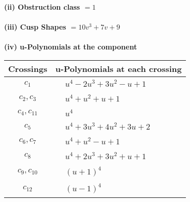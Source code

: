 \documentclass[1p]{elsarticle_modified}
\theoremstyle{definition}
\begin{document}
\flushleft \textbf{(ii) Obstruction class $= 1$}\\~\\
\flushleft \textbf{(iii) Cusp Shapes $= 10 v^3+7 v+9$}\\~\\
\newpage\renewcommand{\arraystretch}{1}
\flushleft \textbf{(iv) u-Polynomials at the component}\newline \\
\begin{tabular}{m{50pt}|m{274pt}}
Crossings & \hspace{64pt}u-Polynomials at each crossing \\
\hline $$\begin{aligned}c_{1}\end{aligned}$$&$\begin{aligned}
&u^4-2 u^3+3 u^2- u+1
\end{aligned}$\\
\hline $$\begin{aligned}c_{2},c_{3}\end{aligned}$$&$\begin{aligned}
&u^4+u^2+u+1
\end{aligned}$\\
\hline $$\begin{aligned}c_{4},c_{11}\end{aligned}$$&$\begin{aligned}
&u^4
\end{aligned}$\\
\hline $$\begin{aligned}c_{5}\end{aligned}$$&$\begin{aligned}
&u^4+3 u^3+4 u^2+3 u+2
\end{aligned}$\\
\hline $$\begin{aligned}c_{6},c_{7}\end{aligned}$$&$\begin{aligned}
&u^4+u^2- u+1
\end{aligned}$\\
\hline $$\begin{aligned}c_{8}\end{aligned}$$&$\begin{aligned}
&u^4+2 u^3+3 u^2+u+1
\end{aligned}$\\
\hline $$\begin{aligned}c_{9},c_{10}\end{aligned}$$&$\begin{aligned}
&(u+1)^4
\end{aligned}$\\
\hline $$\begin{aligned}c_{12}\end{aligned}$$&$\begin{aligned}
&(u-1)^4
\end{aligned}$\\
\hline
\end{tabular}\\~\\
\end{document}
